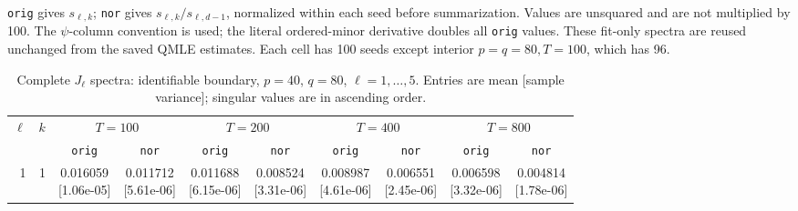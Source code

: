 \documentclass[12pt,letterpaper]{article}
\def\spacingset#1{\renewcommand{\baselinestretch}{#1}\small\normalsize}
\theoremstyle{plain}
\theoremstyle{definition}
\begin{document}
\begin{table}[p]
\begin{adjustbox}{max width=\linewidth}
\begin{tabular}{@{}rr*{8}{c}@{}}
\bottomrule
\end{tabular}
\end{adjustbox}
\par\smallskip
\begin{minipage}{0.98\linewidth}\footnotesize
\texttt{orig} gives $s_{\ell,k}$; \texttt{nor} gives $s_{\ell,k}/s_{\ell,d-1}$, normalized within each seed before summarization. Values are unsquared and are not multiplied by 100. The $\psi$-column convention is used; the literal ordered-minor derivative doubles all \texttt{orig} values. These fit-only spectra are reused unchanged from the saved QMLE estimates. Each cell has 100 seeds except interior $p=q=80,T=100$, which has 96.
\end{minipage}
\endgroup
\end{table}
\clearpage
\begin{table}[p]
\begingroup
\spacingset{1.0}
\small\centering
\caption{Complete $J_\ell$ spectra: identifiable boundary, $p=40$, $q=80$, $\ell=1,\ldots,5$. Entries are mean [sample variance]; singular values are in ascending order.}
\label{s23:lambda:alltab:spectra:p40q80boundary:1-5}
\footnotesize
\setlength{\tabcolsep}{2.2pt}
\renewcommand{\arraystretch}{1.03}
\begin{adjustbox}{max width=\linewidth}
\begin{tabular}{@{}rr*{8}{c}@{}}
\toprule
$\ell$ & $k$ & \multicolumn{2}{c}{$T=100$} & \multicolumn{2}{c}{$T=200$} & \multicolumn{2}{c}{$T=400$} & \multicolumn{2}{c}{$T=800$}\\
\cmidrule(lr){3-4}\cmidrule(lr){5-6}\cmidrule(lr){7-8}\cmidrule(lr){9-10}
 &  & \texttt{orig} & \texttt{nor} & \texttt{orig} & \texttt{nor} & \texttt{orig} & \texttt{nor} & \texttt{orig} & \texttt{nor}\\
\midrule
1 & 1 & \shortstack{0.016059\\[-1pt]{\scriptsize[1.06e-05]}} & \shortstack{0.011712\\[-1pt]{\scriptsize[5.61e-06]}} & \shortstack{0.011688\\[-1pt]{\scriptsize[6.15e-06]}} & \shortstack{0.008524\\[-1pt]{\scriptsize[3.31e-06]}} & \shortstack{0.008987\\[-1pt]{\scriptsize[4.61e-06]}} & \shortstack{0.006551\\[-1pt]{\scriptsize[2.45e-06]}} & \shortstack{0.006598\\[-1pt]{\scriptsize[3.32e-06]}} & \shortstack{0.004814\\[-1pt]{\scriptsize[1.78e-06]}}\\

\end{tabular}
\end{adjustbox}
\end{table}
\end{document}
